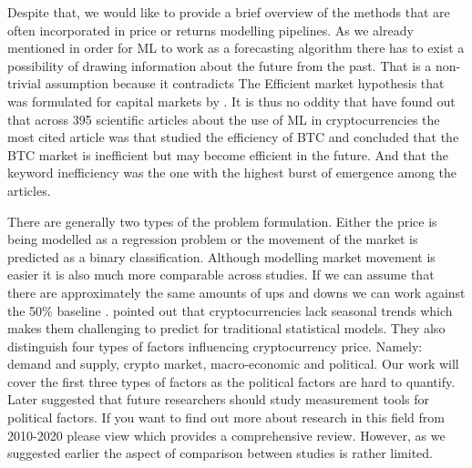 Despite that, we would like to provide a brief overview
of the methods that are often incorporated in price or returns modelling pipelines.
As we already mentioned in order for \ac{ML} to work as a forecasting
algorithm there has to
exist a possibility of drawing information about the future from the past.
That is a non-trivial assumption because it contradicts The Efficient market 
hypothesis
that was formulated for capital markets by \cite{Fama2017}.
It is thus no oddity that \cite{Ren2022} have found out that across 395 scientific
articles about the use of \ac{ML} in cryptocurrencies the most cited 
article was \cite{Urquhart2016} that studied the efficiency of \ac{BTC} and 
concluded that the \ac{BTC} market is inefficient but may become efficient in the future.
And that the keyword
inefficiency was the one with the highest burst of emergence among the articles.


There are generally two types of the problem formulation. Either the price is 
being modelled as a regression problem or the movement of the market is predicted
as a binary classification. Although modelling market movement
is easier it is also much more comparable across studies. If we can assume 
that there are approximately the same amounts of ups and downs we can work
against the 50\% baseline \cite{Akyildirim2020}.
\cite{Khedr2021} pointed out that cryptocurrencies lack seasonal trends
which makes them challenging to predict for traditional statistical models. 
They also distinguish four types of factors influencing cryptocurrency price.
Namely: demand and supply, crypto market, macro-economic and political. 
Our work will cover the first three types of factors as the political factors
are hard to quantify. Later \cite{Ren2022} suggested that future researchers should
study measurement tools for political factors. 
If you want to find out more about research in this
field from 2010-2020 please view \cite{Khedr2021} which provides a comprehensive
review. However, as we suggested 
earlier the aspect of comparison between studies is rather limited.


